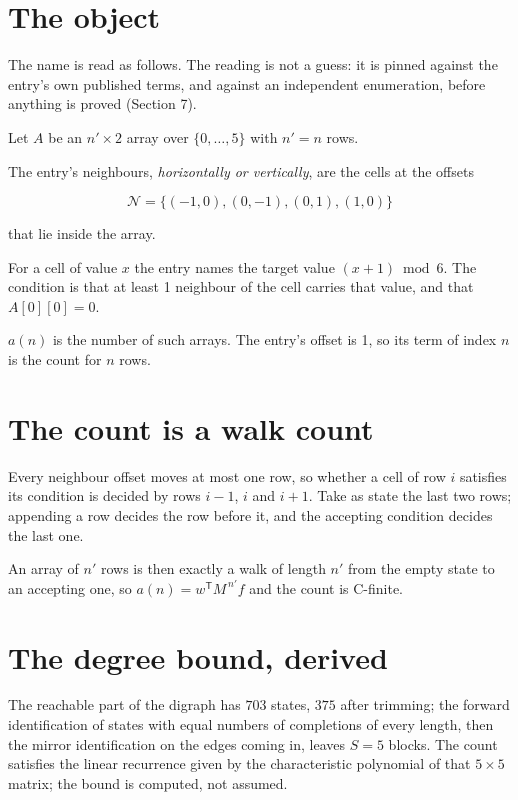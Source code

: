 \documentclass[11pt]{article}
\theoremstyle{definition}
\begin{document}
\section{The object}

The name is read as follows. The reading is not a guess: it is pinned against the entry's own published terms, and against an independent enumeration, before anything is proved (Section 7).

Let $A$ be an $n' \times 2$ array over $\{0,\dots,5\}$ with $n' = n$ rows.

The entry's neighbours, {\itshape horizontally or vertically}, are the cells at the offsets

\[\mathcal{N} = \{(-1,0), (0,-1), (0,1), (1,0)\}\]

that lie inside the array.

For a cell of value $x$ the entry names the target value $(x + 1) \bmod 6$. The condition is that at least 1 neighbour of the cell carries that value, and that $A[0][0] = 0$.

$a(n)$ is the number of such arrays. The entry's offset is 1, so its term of index $n$ is the count for $n$ rows.

\section{The count is a walk count}

Every neighbour offset moves at most one row, so whether a cell of row $i$ satisfies its condition is decided by rows $i-1$, $i$ and $i+1$. Take as state the last two rows; appending a row decides the row before it, and the accepting condition decides the last one.

An array of $n'$ rows is then exactly a walk of length $n'$ from the empty state to an accepting one, so $a(n) = w^{\mathsf T}M^{\,n'}f$ and the count is C-finite.

\section{The degree bound, derived}

The reachable part of the digraph has $703$ states, $375$ after trimming; the forward identification of states with equal numbers of completions of every length, then the mirror identification on the edges coming in, leaves $S = 5$ blocks. The count satisfies the linear recurrence given by the characteristic polynomial of that $5\times5$ matrix; the bound is computed, not assumed.
\end{document}
